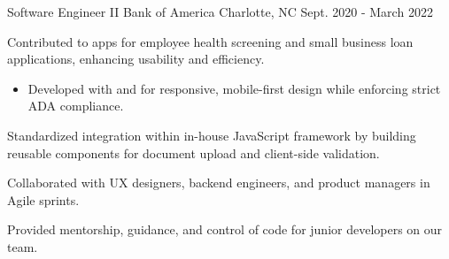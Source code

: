 \begin{cventries}
\cventry
{Software Engineer II} %
{Bank of America} %
{Charlotte, NC} %
{Sept. 2020 - March 2022} %
{
  \begin{cvitems} %
    \item {Contributed to  apps for employee health screening and small business loan applications, enhancing usability and efficiency.}
    \begin{itemize}[leftmargin=2.5ex, itemsep=.8mm]
      \vspace{.8mm}
      \item {Developed with  and  for responsive, mobile-first design while enforcing strict ADA compliance.}
      \vspace{.3mm}
    \end{itemize}
    \item {Standardized  integration within in-house JavaScript framework by building reusable components for document upload and client-side validation.}
    \item {Collaborated with UX designers, backend engineers, and product managers in Agile sprints.}
    \item {Provided mentorship, guidance, and control of code for junior developers on our team.}
  \end{cvitems}
}


\end{cventries}
